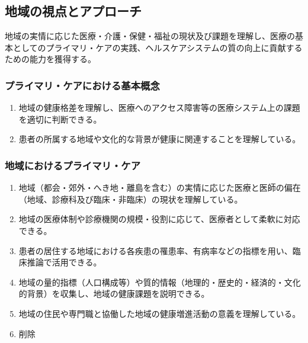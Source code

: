 \documentclass[
]{ltjsarticle}
\providecommand{\tightlist}{%
  \setlength{\itemsep}{0pt}\setlength{\parskip}{0pt}}
\begin{document}
\hypertarget{ux5730ux57dfux306eux8996ux70b9ux3068ux30a2ux30d7ux30edux30fcux30c1}{%
\subsection{地域の視点とアプローチ}\label{ux5730ux57dfux306eux8996ux70b9ux3068ux30a2ux30d7ux30edux30fcux30c1}}

地域の実情に応じた医療・介護・保健・福祉の現状及び課題を理解し、医療の基本としてのプライマリ・ケアの実践、ヘルスケアシステムの質の向上に貢献するための能力を獲得する。

\hypertarget{ux30d7ux30e9ux30a4ux30deux30eaux30b1ux30a2ux306bux304aux3051ux308bux57faux672cux6982ux5ff5}{%
\subsubsection{プライマリ・ケアにおける基本概念}\label{ux30d7ux30e9ux30a4ux30deux30eaux30b1ux30a2ux306bux304aux3051ux308bux57faux672cux6982ux5ff5}}

\begin{enumerate}
\def\labelenumi{\arabic{enumi}.}
\tightlist
\item
  地域の健康格差を理解し、医療へのアクセス障害等の医療システム上の課題を適切に判断できる。
\item
  患者の所属する地域や文化的な背景が健康に関連することを理解している。
\end{enumerate}

\hypertarget{ux5730ux57dfux306bux304aux3051ux308bux30d7ux30e9ux30a4ux30deux30eaux30b1ux30a2}{%
\subsubsection{地域におけるプライマリ・ケア}\label{ux5730ux57dfux306bux304aux3051ux308bux30d7ux30e9ux30a4ux30deux30eaux30b1ux30a2}}

\begin{enumerate}
\def\labelenumi{\arabic{enumi}.}
\tightlist
\item
  地域（都会・郊外・へき地・離島を含む）の実情に応じた医療と医師の偏在（地域、診療科及び臨床・非臨床）の現状を理解している。
\item
  地域の医療体制や診療機関の規模・役割に応じて、医療者として柔軟に対応できる。
\item
  患者の居住する地域における各疾患の罹患率、有病率などの指標を用い、臨床推論で活用できる。
\item
  地域の量的指標（人口構成等）や質的情報（地理的・歴史的・経済的・文化的背景）を収集し、地域の健康課題を説明できる。
\item
  地域の住民や専門職と協働した地域の健康増進活動の意義を理解している。
\item
  削除
\end{enumerate}
\end{document}
